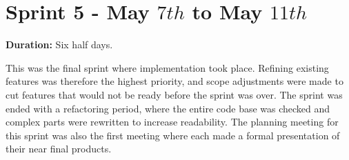 \section{Sprint 5 - May $7th$ to May $11th$}

\textbf{Duration:} Six half days. \newline

This was the final sprint where implementation took place. 
Refining existing features was therefore the highest priority, and scope adjustments were made to cut features that would not be ready before the sprint was over. 
The sprint was ended with a refactoring period, where the entire code base was checked and complex parts were rewritten to increase readability. \newline
The planning meeting for this sprint was also the first meeting where each \localgroup{} made a formal presentation of their near final products.